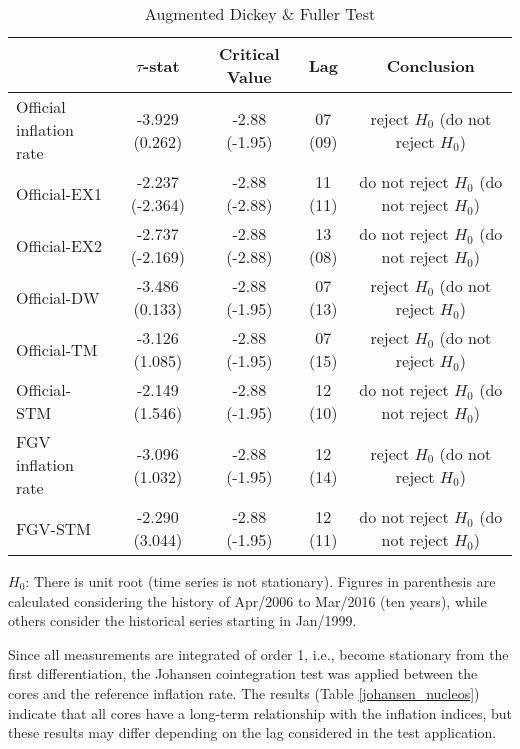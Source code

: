 \documentclass[10pt]{article}
\begin{document}
\begin{table}[b]
\centering
\caption{Augmented Dickey \& Fuller Test}\label{adf_nucleos}
\begin{threeparttable}
\begin{tabular}{@{}l|cccc@{}}
\toprule
           & \textbf{$\tau$-stat} & \textbf{Critical Value} & \textbf{Lag} & \textbf{Conclusion} \\ \midrule
Official inflation rate  & -3.929 (0.262)   & -2.88 (-1.95)                 & 07 (09)          & reject $H_0$     (do not reject $H_0$) \\
Official-EX1             & -2.237 (-2.364)  & -2.88 (-2.88)                 & 11 (11)          & do not reject $H_0$ (do not reject $H_0$) \\
Official-EX2             & -2.737 (-2.169)  & -2.88 (-2.88)                 & 13 (08)          & do not reject $H_0$ (do not reject $H_0$) \\
Official-DW              & -3.486 (0.133)   & -2.88 (-1.95)                 & 07 (13)          & reject $H_0$     (do not reject $H_0$) \\
Official-TM              & -3.126 (1.085)   & -2.88 (-1.95)                 & 07 (15)          & reject $H_0$     (do not reject $H_0$) \\
Official-STM             & -2.149 (1.546)   & -2.88 (-1.95)                 & 12 (10)          & do not reject $H_0$ (do not reject $H_0$) \\ \midrule
FGV inflation rate       & -3.096 (1.032)   & -2.88 (-1.95)                 & 12 (14)          & reject $H_0$     (do not reject $H_0$) \\
FGV-STM                  & -2.290 (3.044)   & -2.88 (-1.95)                 & 12 (11)          & do not reject $H_0$ (do not reject $H_0$) \\ \bottomrule
\end{tabular}
\begin{tablenotes}
\item \scriptsize{$H_0$: There is unit root (time series is not stationary). Figures in parenthesis are calculated considering the history of Apr/2006 to Mar/2016 (ten years), while others consider the historical series starting in Jan/1999.}
\end{tablenotes}
\end{threeparttable}
\end{table}

Since all measurements are integrated of order 1, i.e., become stationary from the first differentiation, the Johansen cointegration test was applied between the cores and the reference inflation rate. The results (Table \ref{johansen_nucleos}) indicate that all cores have a long-term relationship with the inflation indices, but these results may differ depending on the lag considered in the test application.
\end{document}
